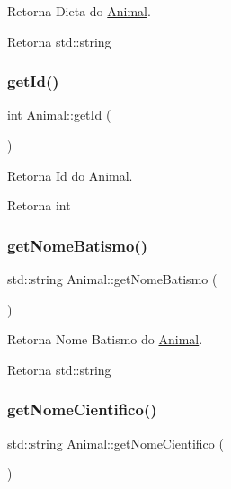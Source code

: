 Retorna Dieta do \hyperlink{classAnimal}{Animal}. 

\begin{DoxyReturn}{Retorna}
std\+::string 
\end{DoxyReturn}
\mbox{\label{classAnimal_a2c27e56355bc2b40d65250da2bb8a102}} 
\subsubsection{\texorpdfstring{get\+Id()}{getId()}}
{\footnotesize\ttfamily int Animal\+::get\+Id (\begin{DoxyParamCaption}{ }\end{DoxyParamCaption})}



Retorna Id do \hyperlink{classAnimal}{Animal}. 

\begin{DoxyReturn}{Retorna}
int 
\end{DoxyReturn}
\mbox{\label{classAnimal_aee0219bd596f0af49fa51fcdad29a1a7}} 
\subsubsection{\texorpdfstring{get\+Nome\+Batismo()}{getNomeBatismo()}}
{\footnotesize\ttfamily std\+::string Animal\+::get\+Nome\+Batismo (\begin{DoxyParamCaption}{ }\end{DoxyParamCaption})}



Retorna Nome Batismo do \hyperlink{classAnimal}{Animal}. 

\begin{DoxyReturn}{Retorna}
std\+::string 
\end{DoxyReturn}
\mbox{\label{classAnimal_a9b316bf80a121cd5dc077158055c162f}} 
\subsubsection{\texorpdfstring{get\+Nome\+Cientifico()}{getNomeCientifico()}}
{\footnotesize\ttfamily std\+::string Animal\+::get\+Nome\+Cientifico (\begin{DoxyParamCaption}{ }\end{DoxyParamCaption})}



